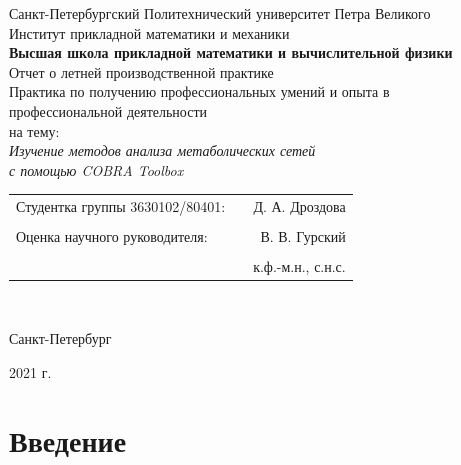 \documentclass[a4paper, 12pt]{article}
\begin{document}
\begin{center}
\hfill \break
\footnotesize{Санкт-Петербургский Политехнический университет Петра Великого}\\ 
\footnotesize{Институт прикладной математики и механики}\\
\small{\textbf{Высшая школа прикладной математики и вычислительной физики}}\\
\hfill\break
\hfill \break
\hfill \break
\hfill \break
\hfill \break
\hfill \break
\hfill \break
\hfill \break
\large{Отчет о летней производственной практике} \\
\hfill \break
\normalsize{Практика по получению профессиональных умений и опыта в \\ профессиональной деятельности \\ на тему: \\ \textit{Изучение методов анализа метаболических сетей \\ с помощью COBRA Toolbox}}\\
\hfill \break
\hfill \break
\hfill \break
\hfill \break
\hfill \break
\hfill \break

\end{center}
 
\normalsize{ 
\begin{tabular}{llr}
Студентка группы 3630102/80401: & \underline{\hspace{4cm}}  & Д. А. Дроздова \\\\
Оценка научного руководителя: & \underline{\hspace{4cm}}  &  В. В. Гурский \\\\
 &    &   к.ф.-м.н., с.н.с.
\end{tabular}
}\\
\hfill \break
\hfill \break
\hfill \break
\hfill \break
\hfill \break
\hfill \break
\hfill \break

\begin{center} Санкт-Петербург \end{center}
\begin{center} 2021 г. \end{center}
\thispagestyle{empty} 
 
\newpage
\tableofcontents
\thispagestyle{empty} 
 
\newpage
\section*{Введение}
 
\end{document}
